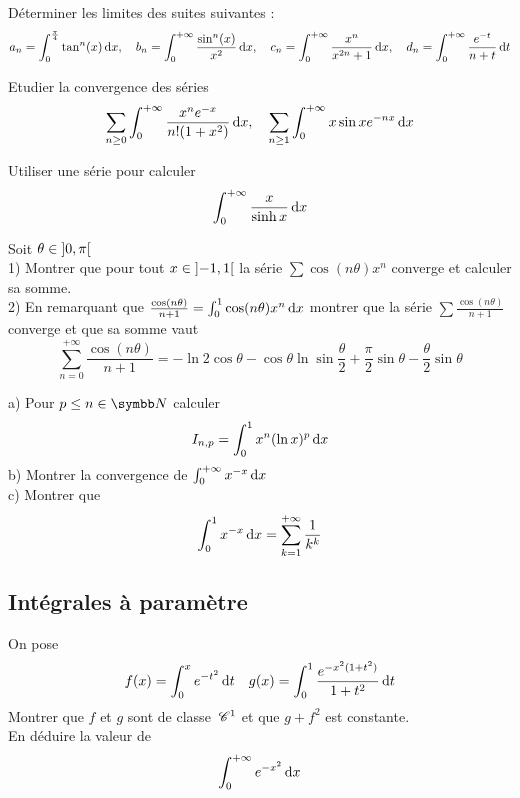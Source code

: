 \begin{exercice}
Déterminer les limites des suites suivantes :
$$ a_{n}=\int_{0}^{\frac{\pi}{4}}\tan^{n}(x)\,\mathrm{d}x, \quad b_{n}=\int_{0}^{+\infty}\frac{\sin^{n}(x)}{x^{2}}\,\mathrm{d}x, \quad c_{n}=\int_{0}^{+ \infty}\frac{x^{n}}{x^{2n}+1}\,\mathrm{d}x, \quad d_n = \int_{0}^{+\infty}\frac{e^{-t}}{n+t}\,\mathrm{d}t $$
\end{exercice}

\begin{exercice}
Etudier la convergence des séries
$$ \sum_{n\ge 0}\int_{0}^{+\infty}\frac{x^{n}e^{-x}}{n!(1+x^{2})}\,\mathrm{d}x, \quad \sum_{n\ge 1}\int_{0}^{+\infty}x \sin x e^{-nx}\,\mathrm{d}x $$
\end{exercice}

\begin{exercice}
Utiliser une série pour calculer
$$ \int_{0}^{+\infty}\frac{x}{\sinh x}\,\mathrm{d}x $$
\end{exercice}

\begin{exercice}
Soit $\theta\in\left]0, \pi\right[$ \\
1) Montrer que pour tout $x\in\left]-1, 1\right[$ la série $\sum \cos(n\theta)x^{n}$ converge et calculer sa somme. \\
2) En remarquant que $\frac{\cos(n\theta)}{n+1}=\int_{0}^{1}\cos(n\theta)x^{n}\,\mathrm{d}x$ montrer que la série $\sum\frac{\cos(n\theta)}{n+1}$ converge et que sa somme vaut
$$ \sum_{n=0}^{+ \infty}\frac{\cos(n\theta)}{n+1} = -\ln 2 \cos \theta - \cos \theta \ln \sin\frac{\theta}{2} + \frac{\pi}{2}\sin \theta - \frac{\theta}{2}\sin \theta $$
\end{exercice}

\begin{exercice}
a) Pour $p\le n\in\N$ calculer
$$ I_{n,p}=\int_{0}^{1}x^{n}(\ln x)^{p}\,\mathrm{d}x $$
b) Montrer la convergence de $\int_{0}^{+\infty}x^{-x}\,\mathrm{d}x$ \\
c) Montrer que
$$ \int_{0}^{1}x^{-x}\,\mathrm{d}x = \sum_{k=1}^{+\infty}\frac{1}{k^{k}} $$
\end{exercice}

\subsection{Intégrales à paramètre}

\begin{exercice}
On pose
$$ f(x)=\int_{0}^{x}e^{-t^{2}}\,\mathrm{d}t \quad g(x)=\int_{0}^{1}\frac{e^{-x^{2}(1+t^{2})}}{1+t^{2}}\,\mathrm{d}t $$
Montrer que $f$ et $g$ sont de classe $\,\mathscr C^{1}$ et que $g+f^{2}$ est constante. \\
En déduire la valeur de
$$ \int_{0}^{+\infty}e^{-x^{2}}\,\mathrm{d}x $$
\end{exercice}

